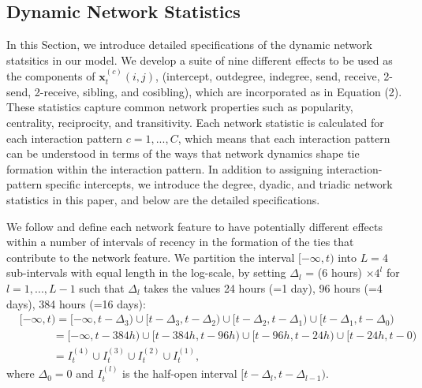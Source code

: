 \subsection{Dynamic Network Statistics} \label{subsec: Dynamic covariates2}
In this Section, we introduce detailed specifications of the dynamic network statsitics in our model. We develop a suite of nine different effects to be used as the components of $\boldsymbol{x}^{(c)}_t(i, j)$, (intercept, outdegree, indegree, send, receive, 2-send, 2-receive, sibling, and cosibling), which are incorporated as in Equation (2).  These statistics capture common network properties such as popularity, centrality, reciprocity, and transitivity. Each network statistic is calculated for each interaction pattern $c=1,...,C$, which means that each interaction pattern can be understood in terms of the ways that network dynamics shape tie formation within the interaction pattern. In addition to assigning interaction-pattern specific intercepts, we introduce the degree, dyadic, and triadic network statistics in this paper, and below are the detailed specifications.

We follow \cite{PerryWolfe2012} and define each network feature to have potentially different effects within a number of intervals of recency in the formation of the ties that contribute to the network feature. We partition the interval $[-\infty, t)$ into $L=4$ sub-intervals with equal length in the log-scale, by setting $\Delta_l$ = (6 hours) $\times  4^l$ for $l=1,...,L-1$ such that $\Delta_l$ takes the values 24 hours (=1 day), 96 hours (=4 days), 384 hours (=16 days): 
\begin{equation*}
\begin{aligned}
&[-\infty,t) =[-\infty,t-\Delta_3)\cup [t-\Delta_3, t-\Delta_{2}) \cup [t-\Delta_{2}, t-\Delta_{1})\cup [t-\Delta_1, t-\Delta_{0})\\& \quad\quad\quad= [-\infty,t-384h)\cup [t-384h, t-96h) \cup [t-96h, t-24h)\cup [t-24h, t-0)
\\& \quad\quad\quad=I_t^{(4)}\cup  I_t^{(3)}\cup  I_t^{(2)}\cup I_t^{(1)},
\end{aligned}
\end{equation*}
where $\Delta_0 = 0$ and $I_{t}^{(l)} $ is the half-open interval $[t-\Delta_l, t-\Delta_{l-1})$. 

